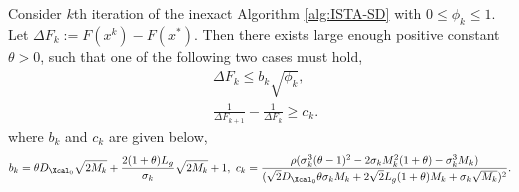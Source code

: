 \documentclass[11pt]{article}
\numberwithin{equation}{section}
\begin{document}
\begin{lemma}
\label{lem:bound_iter_inexact}
	Consider $k$th iteration of the inexact Algorithm \ref{alg:ISTA-SD} with $0 \leq \phi_k\leq 1$. Let $\Delta F_k := F(x^k) - F(x^*)$. Then there exists large enough positive constant $\theta > 0$, such that one of the following two cases must hold,
	\begin{align}
		\label{equ:bound_F_inexact_case1}
	    &\Delta F_k \leq b_k\sqrt{\phi_k}, \\
	    \label{equ:bound_F_inexact_case2}
	    &\frac{1}{\Delta F_{k+1}}-\frac{1}{\Delta F_{k}}\geq c_k.
	\end{align}
	where $b_k$ and $c_k$ are given below,
	\begin{align}
	\label{equ:bound_bk_ck}
	    b_k = \theta D_{\Xcal_0}\sqrt{2M_k}+  \frac{2(1+\theta)L_g}{\sigma_k}\sqrt{2M_k} + 1, 
	    ~
	    c_k=\frac{\rho(\sigma_k^3(\theta-1)^2 - 2\sigma_kM_k^2(1+\theta) - \sigma_k^3M_k )}{(\sqrt{2}D_{\Xcal_0}\theta\sigma_kM_k + 2\sqrt{2}L_g(1+\theta)M_k + \sigma_k\sqrt{M_k} )^2}.
	\end{align}
\end{lemma}
\end{document}
